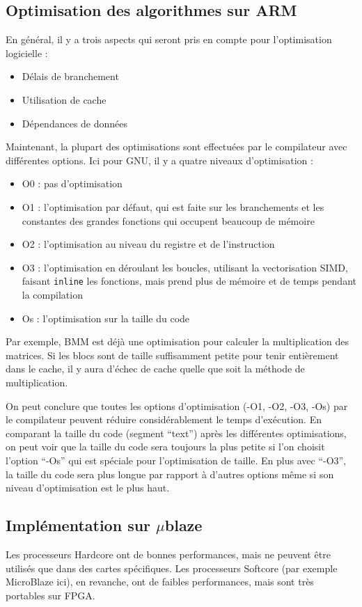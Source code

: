 \documentclass[12pt,a4paper]{article}
\begin{document}
\subsection{Optimisation des algorithmes sur ARM}
En général, il y a trois aspects qui seront pris en compte pour l’optimisation logicielle :
\begin{itemize}
\item Délais de branchement
\item Utilisation de cache
\item Dépendances de données
\end{itemize}
Maintenant, la plupart des optimisations sont effectuées par le compilateur avec différentes options. Ici pour GNU, il y a quatre niveaux d’optimisation :
\begin{itemize}
\item O0 : pas d’optimisation
\item O1 : l’optimisation par défaut, qui est faite sur les branchements et les constantes des grandes fonctions qui occupent beaucoup de mémoire
\item  O2 : l’optimisation au niveau du registre et de l’instruction 
\item O3 : l’optimisation en déroulant les boucles, utilisant la vectorisation SIMD, faisant \texttt{inline} les fonctions, mais prend plus de mémoire et de temps pendant la compilation
\item Os : l’optimisation sur la taille du code
\end{itemize}

Par exemple, BMM est déjà une optimisation pour calculer la multiplication des matrices. Si les blocs sont de taille suffisamment petite pour tenir entièrement dans le cache, il y aura d’échec de cache quelle que soit la méthode de multiplication.

On peut conclure que toutes les options d'optimisation (-O1, -O2, -O3, -Os) par le compilateur peuvent réduire considérablement le temps d'exécution. En comparant la taille du code (segment “text”) après les différentes optimisations, on peut voir que la taille du code sera toujours la plus petite si l’on choisit l’option “-Os” qui est spéciale pour l’optimisation de taille. En plus avec “-O3”, la taille du code sera plus longue par rapport à d'autres options même si son niveau d’optimisation est le plus haut.

\subsection{Implémentation sur $\mu$blaze}
Les processeurs Hardcore ont de bonnes performances, mais ne peuvent être utilisés que dans des cartes spécifiques. Les processeurs Softcore (par exemple MicroBlaze ici), en revanche, ont de faibles performances, mais sont très portables sur FPGA.
\end{document}
